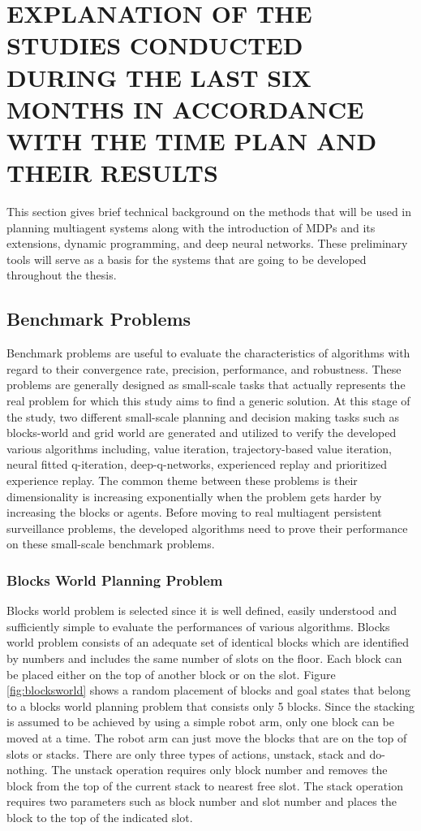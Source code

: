 \documentclass{ituphdreport}
\begin{document}
\section{EXPLANATION OF THE STUDIES CONDUCTED DURING THE LAST SIX  MONTHS IN ACCORDANCE WITH THE TIME PLAN AND THEIR RESULTS} \label{sec:literature}
This section gives brief technical background on the methods that will be used in planning multiagent systems along with the introduction of MDPs and its extensions, dynamic programming, and deep neural networks. These preliminary tools will serve as a basis for the systems that are going to be developed throughout the thesis.

\subsection{Benchmark Problems} \label{sec:benchmarkproblems}
Benchmark problems are useful to evaluate the characteristics of algorithms with regard to their convergence rate, precision, performance, and robustness. These problems are generally designed as small-scale tasks that actually represents the real problem for which this study aims to find a generic solution. At this stage of the study, two different small-scale planning and decision making tasks such as blocks-world and grid world are generated and utilized to verify the developed various algorithms including, value iteration, trajectory-based value iteration, neural fitted q-iteration,  deep-q-networks, experienced replay and prioritized experience replay. The common theme between these problems is their dimensionality is increasing exponentially when the problem gets harder by increasing the blocks or agents. Before moving to real multiagent persistent surveillance problems, the developed algorithms need to prove their performance on these small-scale benchmark problems.


\subsubsection{Blocks World Planning Problem} \label{sec:blocksworldproblem}
Blocks world problem is selected since it is well defined, easily understood and sufficiently simple to evaluate the performances of various algorithms. Blocks world problem consists of an adequate set of identical blocks which are identified by numbers and includes the same number of slots on the floor. Each block can be placed either on the top of another block or on the slot. Figure \ref{fig:blocksworld} shows a random placement of blocks and goal states that belong to a blocks world planning problem that consists only 5 blocks. Since the stacking is assumed to be achieved by using a simple robot arm, only one block can be moved at a time. The robot arm can just move the blocks that are on the top of slots or stacks. There are only three types of actions, unstack, stack and do-nothing. The unstack operation requires only block number and removes the block from the top of the current stack to nearest free slot. The stack operation requires two parameters such as block number and slot number and places the block to the top of the indicated slot. 
\end{document}
